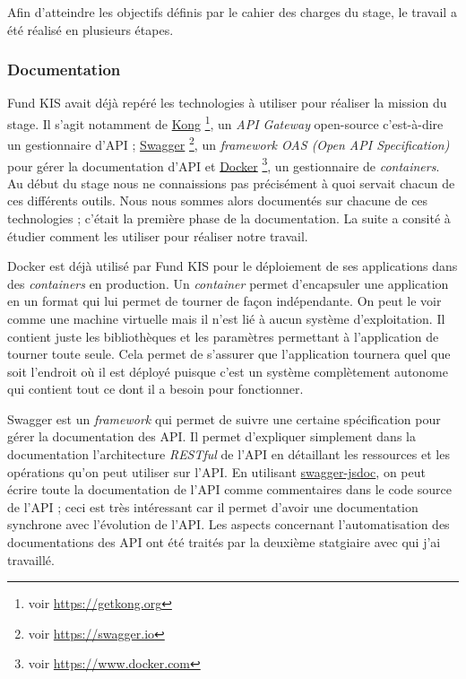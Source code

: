 Afin d'atteindre les objectifs définis par le cahier des charges du stage, le travail a été réalisé en plusieurs étapes.

\subsubsection{Documentation}
Fund KIS avait déjà repéré les technologies à utiliser pour réaliser la mission du stage. Il s'agit notamment de \href{https://getkong.org}{Kong} \footnote{voir \url{https://getkong.org}}, un \textit{API Gateway} open-source c'est-à-dire un gestionnaire d'API ; \href{https://swagger.io}{Swagger} \footnote{voir \url{https://swagger.io}}, un \textit{framework OAS (Open API Specification)} pour gérer la documentation d'API et \href{https://www.docker.com}{Docker} \footnote{voir \url{https://www.docker.com}}, un gestionnaire de \textit{containers}. Au début du stage nous ne connaissions pas précisément à quoi servait chacun de ces différents outils. Nous nous sommes alors documentés sur chacune de ces technologies ; c'était la première phase de la documentation. La suite a consité à étudier comment les utiliser pour réaliser notre travail.

\vspace{3mm}

Docker est déjà utilisé par Fund KIS pour le déploiement de ses applications dans des \textit{containers} en production. Un \textit{container} permet d'encapsuler une application en un format qui lui permet de tourner de façon indépendante. On peut le voir comme une machine virtuelle mais il n'est lié à aucun système d'exploitation. Il contient juste les bibliothèques et les paramètres permettant à l'application de tourner toute seule. Cela permet de s'assurer que l'application tournera quel que soit l'endroit où il est déployé puisque c'est un système complètement autonome qui contient tout ce dont il a besoin pour fonctionner.

\vspace{3mm}

Swagger est un \textit{framework} qui permet de suivre une certaine spécification pour gérer la documentation des API. Il permet d'expliquer simplement dans la documentation l'architecture \textit{RESTful} de l'API en détaillant les ressources et les opérations qu'on peut utiliser sur l'API. En utilisant \href{https://github.com/Surnet/swagger-jsdoc}{swagger-jsdoc}, on peut écrire toute la documentation de l'API comme commentaires dans le code source de l'API ; ceci est très intéressant car il permet d'avoir une documentation synchrone avec l'évolution de l'API. Les aspects concernant l'automatisation des documentations des API ont été traités par la deuxième statgiaire avec qui j'ai travaillé.

